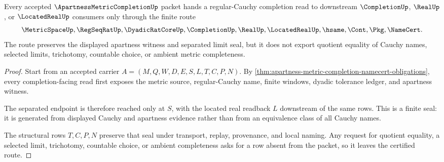 \begin{theorem}
\label{thm:apartness-metric-completion-apartness-cauchy-limit-seal}
Every accepted $\ApartnessMetricCompletionUp$ packet hands a regular-Cauchy completion read to downstream $\CompletionUp$, $\RealUp$, or $\LocatedRealUp$ consumers only through the finite route
$$
\MetricSpaceUp,\RegSeqRatUp,\DyadicRatCoreUp,\CompletionUp,\RealUp,\LocatedRealUp,\hsame,\Cont,\Pkg,\NameCert .
$$
The route preserves the displayed apartness witness and separated limit seal, but it does not export quotient equality of Cauchy names, selected limits, trichotomy, countable choice, or ambient metric completeness.
\end{theorem}
\begin{proof}
Start from an accepted carrier $A=(M,Q,W,D,E,S,L,T,C,P,N)$. By \autoref{thm:apartness-metric-completion-namecert-obligations}, every completion-facing read first exposes the metric source, regular-Cauchy name, finite windows, dyadic tolerance ledger, and apartness witness.

The separated endpoint is therefore reached only at $S$, with the located real readback $L$ downstream of the same rows. This is a finite seal: it is generated from displayed Cauchy and apartness evidence rather than from an equivalence class of all Cauchy names.

The structural rows $T,C,P,N$ preserve that seal under transport, replay, provenance, and local naming. Any request for quotient equality, a selected limit, trichotomy, countable choice, or ambient completeness asks for a row absent from the packet, so it leaves the certified route.
\end{proof}




